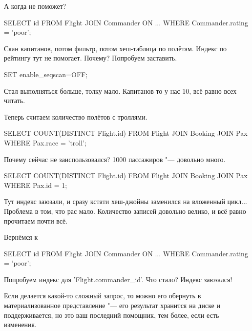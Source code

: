 А когда не поможет?
\begin{sqlcode}
SELECT
	id
	FROM Flight
	JOIN Commander ON ...
	WHERE Commander.rating = 'poor';
\end{sqlcode}
Скан капитанов, потом фильтр, потом хеш-таблица по полётам.
Индекс по рейтингу тут не помогает. Почему? Попробуем заставить.
\begin{sqlcode}
SET enable_seqscan=OFF;
\end{sqlcode}
Стал выполняться больше, толку мало.
Капитанов-то у нас 10, всё равно всех читать.

Теперь считаем количество полётов с троллями.
\begin{sqlcode}
SELECT
	COUNT(DISTINCT Flight.id)
	FROM Flight
	JOIN Booking
	JOIN Pax
	WHERE Pax.race = 'troll';
\end{sqlcode}
Почему сейчас не заиспользовался? 1000 пассажиров "--- довольно много.
\begin{sqlcode}
SELECT
	COUNT(DISTINCT Flight.id)
	FROM Flight
	JOIN Booking
	JOIN Pax
	WHERE Pax.id = 1;
\end{sqlcode}
Тут индекс заюзали, и сразу кстати хеш-джойны заменился на вложенный цикл...
Проблема в том, что рас мало. Количество записей довольно велико, и всё равно прочитаем почти всё.

Вернёмся к 
\begin{sqlcode}
SELECT
	id
	FROM Flight
	JOIN Commander ON ...
	WHERE Commander.rating = 'poor';
\end{sqlcode}
Попробуем индекс для \sql'Flight.commander_id'.
Что стало? Индекс заюзался!

Если делается какой-то сложный запрос, то можно его обернуть в материализованное представление "--- его результат хранится на диске и поддерживается, но это ваш последний помощник, тем более, если есть изменения.
